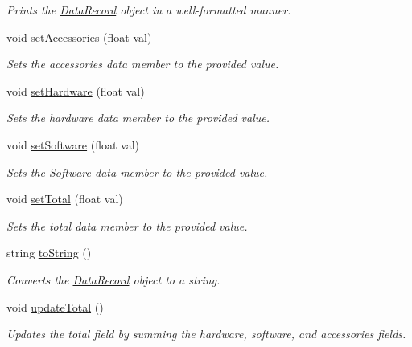 \begin{DoxyCompactItemize}
\begin{DoxyCompactList}\small\item\em Prints the \hyperlink{classDataRecord}{Data\-Record} object in a well-\/formatted manner. \end{DoxyCompactList}\item 
void \hyperlink{classDataRecord_a17dd98967502f3fdbfd8d611e50b8cf1}{set\-Accessories} (float val)
\begin{DoxyCompactList}\small\item\em Sets the accessories data member to the provided value. \end{DoxyCompactList}\item 
void \hyperlink{classDataRecord_a11be3829611599f63d8cdc1b78f2e075}{set\-Hardware} (float val)
\begin{DoxyCompactList}\small\item\em Sets the hardware data member to the provided value. \end{DoxyCompactList}\item 
void \hyperlink{classDataRecord_a0bca4a4d9088733e0d83cc6f602a400a}{set\-Software} (float val)
\begin{DoxyCompactList}\small\item\em Sets the Software data member to the provided value. \end{DoxyCompactList}\item 
void \hyperlink{classDataRecord_a59a60fd621917ea907a8020d929d75ea}{set\-Total} (float val)
\begin{DoxyCompactList}\small\item\em Sets the total data member to the provided value. \end{DoxyCompactList}\item 
string \hyperlink{classDataRecord_a0c7343d8583d1c3c5582e683ff54daed}{to\-String} ()
\begin{DoxyCompactList}\small\item\em Converts the \hyperlink{classDataRecord}{Data\-Record} object to a string. \end{DoxyCompactList}\item 
\hypertarget{classDataRecord_ae5aece25155248b9cfb6750f84c4249f}{void \hyperlink{classDataRecord_ae5aece25155248b9cfb6750f84c4249f}{update\-Total} ()}\label{classDataRecord_ae5aece25155248b9cfb6750f84c4249f}

\begin{DoxyCompactList}\small\item\em Updates the total field by summing the hardware, software, and accessories fields. \end{DoxyCompactList}\end{DoxyCompactItemize}


